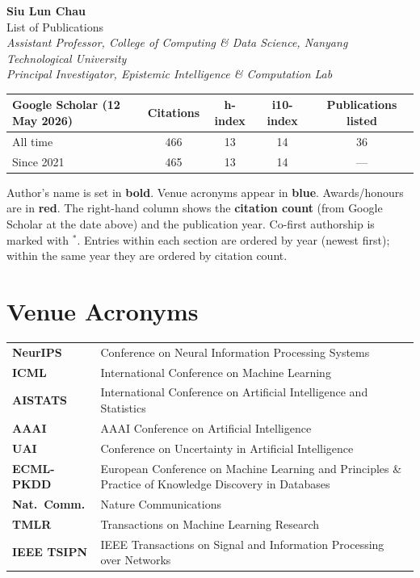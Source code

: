 \documentclass[11pt,a4paper]{article}
\newcommand{\acro}[1]{\textcolor{accent}{\textbf{#1}}}
\begin{document}
\noindent
{\Huge\bfseries\color{accent} Siu Lun Chau}\\[4pt]
{\large List of Publications}\\[2pt]
\textit{Assistant Professor, College of Computing \& Data Science, Nanyang Technological University}\\
\textit{Principal Investigator, Epistemic Intelligence \& Computation Lab}

\vspace{6pt}

\noindent
\begin{tabularx}{\linewidth}{@{}lcccc@{}}
\toprule
\textbf{Google Scholar (12 May 2026)} & \textbf{Citations} & \textbf{h-index} & \textbf{i10-index} & \textbf{Publications listed} \\
\midrule
All time   & 466 & 13 & 14 & 36 \\
Since 2021 & 465 & 13 & 14 & --- \\
\bottomrule
\end{tabularx}

\vspace{4pt}
\noindent\small Author's name is set in \textbf{bold}. Venue acronyms appear in {\color{accent}\textbf{blue}}. Awards/honours are in {\color{award}\textbf{red}}. The right-hand column shows the {\color{citecol}\textbf{citation count}} (from Google Scholar at the date above) and the publication year. Co-first authorship is marked with $^{*}$. Entries within each section are ordered by year (newest first); within the same year they are ordered by citation count.
\normalsize

\section{Venue Acronyms}
\noindent
\begin{tabularx}{\linewidth}{@{}lX@{}}
\acro{NeurIPS}    & Conference on Neural Information Processing Systems \\
\acro{ICML}       & International Conference on Machine Learning \\
\acro{AISTATS}    & International Conference on Artificial Intelligence and Statistics \\
\acro{AAAI}       & AAAI Conference on Artificial Intelligence \\
\acro{UAI}        & Conference on Uncertainty in Artificial Intelligence \\
\acro{ECML-PKDD}  & European Conference on Machine Learning and Principles \& Practice of Knowledge Discovery in Databases \\
\acro{Nat.~Comm.} & Nature Communications \\
\acro{TMLR}       & Transactions on Machine Learning Research \\
\acro{IEEE TSIPN} & IEEE Transactions on Signal and Information Processing over Networks \\
\end{tabularx}
\end{document}
